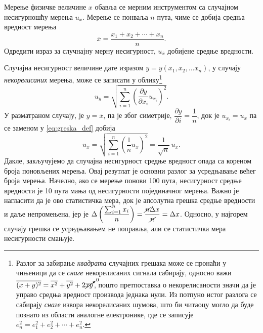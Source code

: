 \mnImportant
\PID
Мерење физичке величине $x$ обавља се мерним инструментом са случајном несигурношћу мерења 
$u_x$. Мерење се понваља $n$ пута, чиме се добија средња вредност мерења 
$$
{\overline x = 
\dfrac{x_1 + x_2 + \cdots + x_n}{n}}.
$$ Одредити израз за случнајну мерну несигурност, $u_{\overline x}$ добијене средње 
вредности. 

\RESENJE 

Случајна несигурност величине дате изразом $y = y(x_1, x_2, \ldots x_n)$, у случају \textit{некорелисаних} мерења, може се 
записати у облику\footnote{Разлог за забирање \textit{квадрата} случајних грешака може се пронаћи у чињеници да се 
\textit{снаге} некорелисаних сигнала сабирају, односно важи 
$ \overline{(x+y)^2} = \overline{x^2} + \overline{y^2} + 2\cancelto{0}{\overline{xy}}$, пошто претпоставка 
о некорелисаности значи да је управо средња вредност производа једнака нули. Из потпуно истог разлога се 
сабирају \textit{снаге} извора некорелисаних шумова, што би читаоцу могло да буде познато из области 
аналогне електронике, где се записује $e_n^2 = e_1^2 + e_2^2 + \cdots + e_n^2$. }
\begin{equation}
    u_y = \sqrt{  \sum_{i = 1}^n \left( \dfrac{\partial y}{\partial x_i} u_{x_i}  \right)^2  }.
    \label{eq:greska_def}
\end{equation} 
У разматраном случају, је $y = \overline x$, па је због симетрије, 
$\dfrac{\partial y}{\partial i} = \dfrac{1}{n}$, док је $u_{x_i} = u_x$ па се заменом у 
\eqref{eq:greska_def} добија
\begin{equation}
    u_{\overline x} = 
    \sqrt{
        \sum_{i = 1}^n \left( \dfrac{1}{n} u_x  \right)^2 
    }
    = \dfrac{1}{\sqrt n} \, u_x.
\end{equation}
Дакле, закључујемо да случајна несигурност средње вредност опада са кореном броја поновљених мерења. Овај резутлат 
је основни разлог за усредњавање већег броја мерења. Начелно, ако се мерење понови 100 пута, несигурност средње вредности је 
10 пута мања од несигурности појединачног мерења. Важно је нагласити да је ово статистичка мера, док је апсолутна 
грешка средње вредности и даље непромењена, јер је 
$\Delta\left( \dfrac{\sum_{i=1}^n x_i}{n} \right) = 
\dfrac{\cancel{n} \Delta x}{\cancel{n}}= \Delta x$. Односно, у најгорем случају грешка се усредњавањем не поправља, али 
се статистичка мера несигурности смањује.

